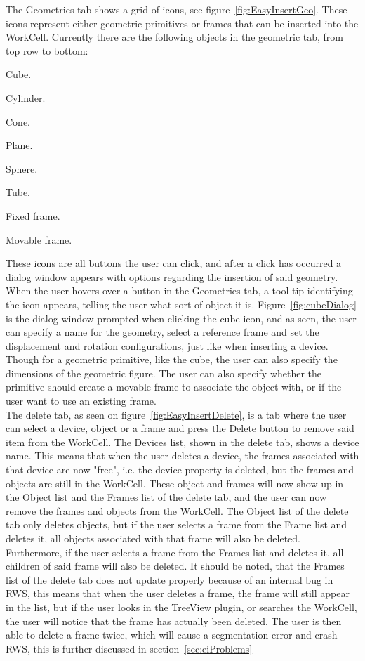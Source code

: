 The Geometries tab shows a grid of icons, see figure~\ref{fig:EasyInsertGeo}. These icons represent either geometric primitives or frames that can be inserted into the WorkCell. Currently there are the following objects in the geometric tab, from top row to bottom:
\begin{enumerate*}[font={\color{red!50!black}\bfseries}]
\item Cube.
\item Cylinder.
\item Cone.
\item Plane.
\item Sphere.
\item Tube.
\item Fixed frame.
\item Movable frame.
\end{enumerate*}
These icons are all buttons the user can click, and after a click has occurred a dialog window appears with options regarding the insertion of said geometry. When the user hovers over a button in the Geometries tab, a tool tip identifying the icon appears, telling the user what sort of object it is. Figure~\ref{fig:cubeDialog} is the dialog window prompted when clicking the cube icon, and as seen, the user can specify a name for the geometry, select a reference frame and set the displacement and rotation configurations, just like when inserting a device. Though for a geometric primitive, like the cube, the user can also specify the dimensions of the geometric figure. The user can also specify whether the primitive should create a movable frame to associate the object with, or if the user want to use an existing frame.\\

The delete tab, as seen on figure~\ref{fig:EasyInsertDelete}, is a tab where the user can select a device, object or a frame and press the Delete button to remove said item from the WorkCell. The Devices list, shown in the delete tab, shows a device name. This means that when the user deletes a device, the frames associated with that device are now "free", i.e. the device property is deleted, but the frames and objects are still in the WorkCell. These object and frames will now show up in the Object list and the Frames list of the delete tab, and the user can now remove the frames and objects from the WorkCell. The Object list of the delete tab only deletes objects, but if the user selects a frame from the Frame list and deletes it, all objects associated with that frame will also be deleted. Furthermore, if the user selects a frame from the Frames list and deletes it, all children of said frame will also be deleted. It should be noted, that the Frames list of the delete tab does not update properly because of an internal bug in RWS, this means that when the user deletes a frame, the frame will still appear in the list, but if the user looks in the TreeView plugin, or searches the WorkCell, the user will notice that the frame has actually been deleted. The user is then able to delete a frame twice, which will cause a segmentation error and crash RWS, this is further discussed in section~\ref{sec:eiProblems}

